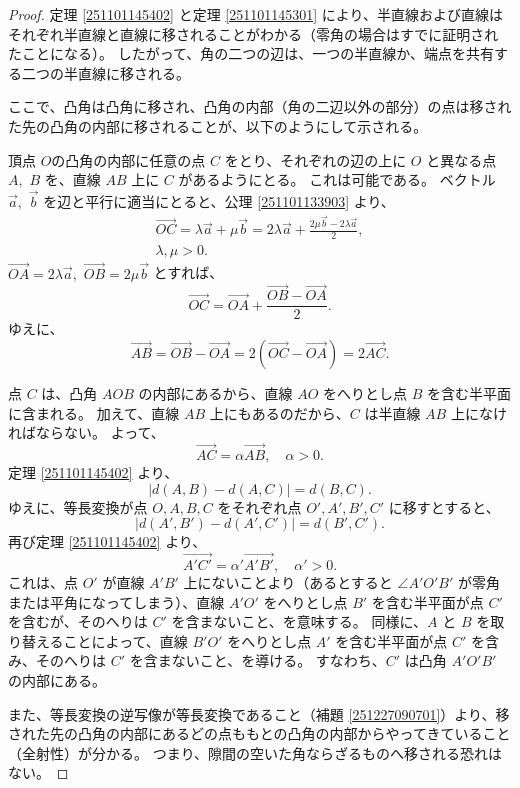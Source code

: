 \begin{proof}
  定理 \ref{251101145402} と定理 \ref{251101145301} により、半直線および直線はそれぞれ半直線と直線に移されることがわかる（零角の場合はすでに証明されたことになる）。
  したがって、角の二つの辺は、一つの半直線か、端点を共有する二つの半直線に移される。

  ここで、凸角は凸角に移され、凸角の内部（角の二辺以外の部分）の点は移された先の凸角の内部に移されることが、以下のようにして示される。

  頂点 \(O\)の凸角の内部に任意の点 \(C\) をとり、それぞれの辺の上に \(O\) と異なる点 \(A,\) \(B\) を、直線 \(AB\) 上に \(C\) があるようにとる。
  これは可能である。
  ベクトル \(\vec{a},\) \(\vec{b}\) を辺と平行に適当にとると、公理 \ref{251101133903} より、
  \begin{gather*}
    \overrightarrow{OC}=\lambda\vec{a}+\mu\vec{b}=2\lambda\vec{a}+\frac{2\mu\vec{b}-2\lambda\vec{a}}{2}, \\
    \lambda,\mu>0.
  \end{gather*}
  \(\overrightarrow{OA}=2\lambda\vec{a},\) \(\overrightarrow{OB}=2\mu\vec{b}\) とすれば、
  \[\overrightarrow{OC}=\overrightarrow{OA}+\frac{\overrightarrow{OB}-\overrightarrow{OA}}{2}.\]
  ゆえに、
  \[\overrightarrow{AB}=\overrightarrow{OB}-\overrightarrow{OA}=2(\overrightarrow{OC}-\overrightarrow{OA})=2\overrightarrow{AC}.\]

  点 \(C\) は、凸角 \(AOB\) の内部にあるから、直線 \(AO\) をへりとし点 \(B\) を含む半平面に含まれる。
  加えて、直線 \(AB\) 上にもあるのだから、\(C\) は半直線 \(AB\) 上になければならない。
  よって、
  \[\overrightarrow{AC}=\alpha\overrightarrow{AB},\quad \alpha>0.\]
  定理 \ref{251101145402} より、
  \[|d(A,B)-d(A,C)|=d(B,C).\]
  ゆえに、等長変換が点 \(O,A,B,C\) をそれぞれ点 \(O',A',B',C'\) に移すとすると、
  \[|d(A',B')-d(A',C')|=d(B',C').\]
  再び定理 \ref{251101145402} より、
  \[\overrightarrow{A'C'}=\alpha'\overrightarrow{A'B'},\quad \alpha'>0.\]
  これは、点 \(O'\) が直線 \(A'B'\) 上にないことより（あるとすると \(\angle A'O'B'\) が零角または平角になってしまう）、直線 \(A'O'\) をへりとし点 \(B'\) を含む半平面が点 \(C'\) を含むが、そのへりは \(C'\) を含まないこと、を意味する。
  同様に、\(A\) と \(B\) を取り替えることによって、直線 \(B'O'\) をへりとし点 \(A'\) を含む半平面が点 \(C'\) を含み、そのへりは \(C'\) を含まないこと、を導ける。
  すなわち、\(C'\) は凸角 \(A'O'B'\) の内部にある。

  また、等長変換の逆写像が等長変換であること（補題 \ref{251227090701}）より、移された先の凸角の内部にあるどの点ももとの凸角の内部からやってきていること（全射性）が分かる。
  つまり、隙間の空いた角ならざるものへ移される恐れはない。


\end{proof}
